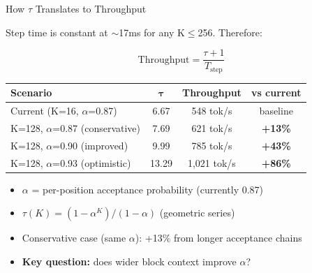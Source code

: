 \documentclass[10pt]{beamer}
\begin{document}
\begin{frame}{How $\tau$ Translates to Throughput}

Step time is constant at $\sim$17ms for any K$\leq$256. Therefore:

$$\text{Throughput} = \frac{\tau + 1}{T_{\text{step}}}$$

\centering
\footnotesize
\vspace{0.3em}
\begin{tabular}{l ccc}
\toprule
\textbf{Scenario} & $\boldsymbol{\tau}$ & \textbf{Throughput} & \textbf{vs current} \\
\midrule
Current (K=16, $\alpha$=0.87) & 6.67 & 548 tok/s & baseline \\
\rowcolor{rowyellow}
K=128, $\alpha$=0.87 (conservative) & 7.69 & 621 tok/s & \textbf{+13\%} \\
\rowcolor{rowgreen}
K=128, $\alpha$=0.90 (improved) & 9.99 & 785 tok/s & \textbf{+43\%} \\
\rowcolor{rowblue}
K=128, $\alpha$=0.93 (optimistic) & 13.29 & 1,021 tok/s & \textbf{+86\%} \\
\bottomrule
\end{tabular}

\vspace{0.8em}
\begin{itemize}
  \item $\alpha$ = per-position acceptance probability (currently 0.87)
  \item $\tau(K) = (1 - \alpha^K) / (1 - \alpha)$ \quad (geometric series)
  \item Conservative case (same $\alpha$): +13\% from longer acceptance chains
  \item \textbf{Key question:} does wider block context improve $\alpha$?
\end{itemize}
\end{frame}
\end{document}
